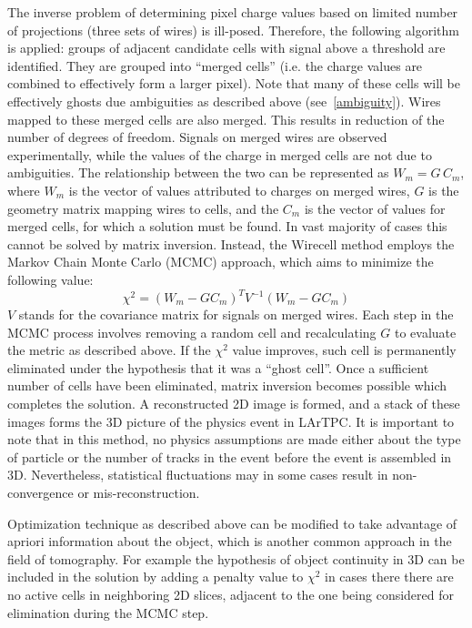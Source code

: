 \documentclass[a4paper]{jpconf}
\begin{document}
\noindent
The inverse problem of determining pixel charge values based on limited number of projections (three sets of wires) is  ill-posed.
Therefore, the following algorithm is applied: groups of adjacent candidate cells with signal above a 
threshold are identified. They are grouped into ``merged cells'' (i.e. the charge values are combined to effectively form a larger pixel).
Note that many of these cells will be effectively ghosts due ambiguities as described above  (see~\ref{ambiguity}).
Wires mapped to these merged cells are also merged. This results in reduction of the number of degrees of freedom. Signals on merged wires
are observed experimentally, while the values of the charge in merged cells are not due to ambiguities. The relationship
between the two can be represented as $W_m=G$\,$C_m$, where $W_m$ is the vector of values attributed to charges on merged wires, $G$ is
the geometry matrix mapping wires to cells, and the $C_m$ is the vector of values for merged cells, for which a solution must be found. In vast majority
of cases this cannot be solved by matrix inversion. Instead, the Wirecell method employs the Markov Chain Monte Carlo (MCMC) approach, which aims
to minimize the following value:
$$\chi^2=(W_m-GC_m)^TV^{-1}(W_m-GC_m)$$
$V$ stands for the covariance matrix for signals on merged wires.
Each step in the MCMC process involves removing a random cell and recalculating $G$ to evaluate the metric as described above. If the $\chi^2$ value
improves, such cell is permanently eliminated under the hypothesis that it was a ``ghost cell''. Once a sufficient number of cells have been eliminated,
matrix inversion becomes possible which completes the solution. A reconstructed 2D image is formed, and a stack of these images forms the 3D
picture of the physics event in LArTPC. It is important to note that in this method, no physics assumptions are made either about the type of particle
or the number of tracks in the event before the event is assembled in 3D.  Nevertheless, statistical fluctuations may in some cases result in non-convergence
or mis-reconstruction.  

Optimization technique as described above can be modified to take advantage of apriori information about the object, which is another common
approach in the field of tomography. For example the hypothesis of object continuity in 3D can be included in the solution by adding a penalty
value to $\chi^2$ in cases there there are no active cells in neighboring 2D slices, adjacent to the one being considered for elimination during the MCMC step.
\end{document}
